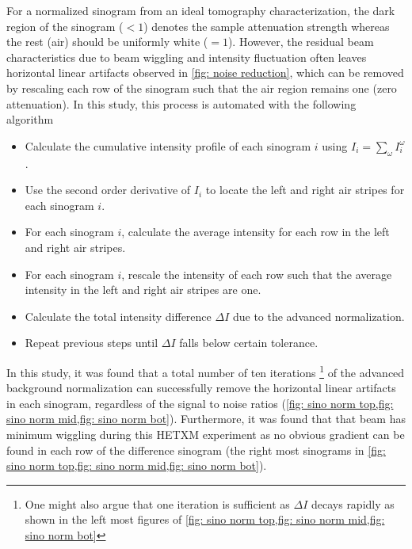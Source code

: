 \documentclass[12pt]{scrartcl}
\begin{document}
For a normalized sinogram from an ideal tomography characterization, the dark region of the sinogram ($<1$) denotes the sample attenuation strength whereas the rest (air) should be uniformly white ($=1$).
However, the residual beam characteristics due to beam wiggling and intensity fluctuation often leaves horizontal linear artifacts observed in \cref{fig: noise reduction}, which can be removed by rescaling each row of the sinogram such that the air region remains one (zero attenuation).
In this study, this process is automated with the following algorithm
%
\begin{itemize}
\item Calculate the cumulative intensity profile of each sinogram $i$ using $I_i = \sum_\omega I^\omega_i$.
\item Use the second order derivative of $I_i$ to locate the left and right air stripes for each sinogram $i$.
\item For each sinogram $i$, calculate the average intensity for each row in the left and right air stripes.
\item For each sinogram $i$, rescale the intensity of each row such that the average intensity in the left and right air stripes are one.
\item Calculate the total intensity difference $\Delta I$ due to the advanced normalization.
\item Repeat previous steps until $\Delta I$ falls below certain tolerance.
\end{itemize}

In this study, it was found that a total number of ten iterations%
\footnote{
One might also argue that one iteration is sufficient as $\Delta I$ decays rapidly as shown in the left most figures of \cref{fig: sino norm top,fig: sino norm mid,fig: sino norm bot}
} of the advanced background normalization can successfully remove the horizontal linear artifacts in each sinogram, regardless of the signal to noise ratios (\cref{fig: sino norm top,fig: sino norm mid,fig: sino norm bot}).
Furthermore, it was found that that beam has minimum wiggling during this HETXM experiment as no obvious gradient can be found in each row of the difference sinogram (the right most sinograms in \cref{fig: sino norm top,fig: sino norm mid,fig: sino norm bot}).
\end{document}

